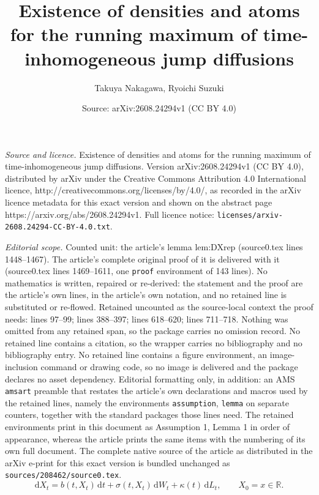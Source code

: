 \documentclass[10pt,a4paper]{amsart}
\title{Existence of densities and atoms for the running maximum of time-inhomogeneous jump diffusions}
\author{Takuya Nakagawa, Ryoichi Suzuki}
\date{Source: arXiv:2608.24294v1 (CC BY 4.0)}
\newcommand{\R}{\mathbb{R}}
\newcommand{\dd}{\mathrm{d}}
\newcommand{\dt}{\,\dd t}
\begin{document}
\maketitle

\noindent\emph{Source and licence.} Existence of densities and atoms for the running maximum of time-inhomogeneous jump diffusions. Version arXiv:2608.24294v1 (CC BY 4.0), distributed by arXiv under the Creative Commons Attribution 4.0 International licence, http://creativecommons.org/licenses/by/4.0/, as recorded in the arXiv licence metadata for this exact version and shown on the abstract page https://arxiv.org/abs/2608.24294v1. Full licence notice: \texttt{licenses/arxiv-2608.24294-CC-BY-4.0.txt}.\par\smallskip

\noindent\textit{Editorial scope.} Counted unit: the article's lemma lem:DXrep (source0.tex lines 1448--1467). The article's complete original proof of it is delivered with it (source0.tex lines 1469--1611, one \texttt{proof} environment of 143 lines). No mathematics is written, repaired or re-derived: the statement and the proof are the article's own lines, in the article's own notation, and no retained line is substituted or re-flowed.  Retained uncounted as the source-local context the proof needs: lines 97--99; lines 388--397; lines 618--620; lines 711--718.  Nothing was omitted from any retained span, so the package carries no omission record.  No retained line contains a citation, so the wrapper carries no bibliography and no bibliography entry.  No retained line contains a figure environment, an image-inclusion command or drawing code, so no image is delivered and the package declares no asset dependency.  Editorial formatting only, in addition: an AMS \texttt{amsart} preamble that restates the article's own declarations and macros used by the retained lines, namely the environments \texttt{assumption}, \texttt{lemma} on separate counters, together with the standard packages those lines need.  The retained environments print in this document as Assumption 1, Lemma 1 in order of appearance, whereas the article prints the same items with the numbering of its own full document.  The complete native source of the article as distributed in the arXiv e-print for this exact version is bundled unchanged as \texttt{sources/208462/source0.tex}.
\begin{equation}\label{eq:SDE-general}
\dd X_t=b(t,X_t)\dt+\sigma(t,X_t)\,\dd W_t+\kappa(t)\,\dd L_t,\qquad X_0=x\in\R.
\end{equation}
\end{document}
